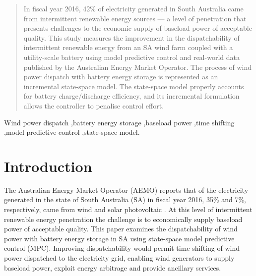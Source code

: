 \documentclass[3p,times,procedia]{elsarticle}
\begin{document}
\begin{frontmatter}
\begin{abstract}
In fiscal year 2016, 42\% of electricity generated in South Australia came from intermittent renewable energy sources --- a level of penetration that presents challenges to the economic supply of baseload power of acceptable quality.  This study measures the improvement in the dispatchability of intermittent renewable energy from an SA wind farm coupled with a utility-scale battery using model predictive control and real-world data published by the Australian Energy Market Operator.  The process of wind power dispatch with battery energy storage is represented as an incremental state-space model.  The state-space model properly accounts for battery charge/discharge efficiency, and its incremental formulation allows the controller to penalise control effort.
\end{abstract}

\begin{keyword}
Wind power dispatch \sep battery energy storage \sep baseload power \sep time shifting \sep model predictive control \sep state-space model.


\end{keyword}

\end{frontmatter}


\section{Introduction}
The Australian Energy Market Operator (AEMO) reports that of the electricity generated in the state of South Australia (SA) in fiscal year 2016, 35\% and 7\%, respectively, came from wind and solar photovoltaic \cite{SAER16}.  At this level of intermittent renewable energy penetration the challenge is to economically supply baseload power of acceptable quality.  This paper examines the dispatchability of wind power with battery energy storage in SA using state-space model predictive control (MPC).  Improving dispatchability would permit time shifting of wind power dispatched to the electricity grid, enabling wind generators to supply baseload power, exploit energy arbitrage and provide ancillary services.  
\end{document}
